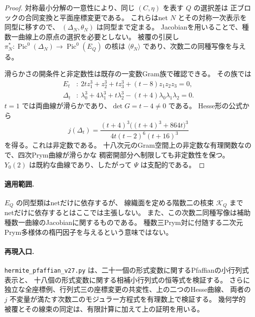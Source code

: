 \begin{proof}
対称最小分解の一意性により、同じ $(C,\eta)$ を表す $Q$ の選択差は
正ブロックの合同変換と平面座標変更である。
これらはnet $N$ とその対称一次表示を同型に移すので、
$(\Delta_N,\theta_N)$ は同型まで定まる。
Jacobianを用いることで、種数一曲線上の原点の選択を必要としない。
被覆の引戻し $\pi_N^*:\operatorname{Pic}^0(\Delta_N)\to\operatorname{Pic}^0(E_Q)$
の核は $\langle\theta_N\rangle$ であり、次数二の同種写像を与える。

滑らかさの開条件と非定数性は既存の一変数Gram族で確認できる。
その族では
\begin{align*}
 E_t&:\ 2tz_1^3+z_2^3+tz_3^3+(t-8)z_1z_2z_3=0,\\
 \Delta_t&:\ \lambda_0^3+4\lambda_1^3+t\lambda_2^3
                    -(t+4)\lambda_0\lambda_1\lambda_2=0.
\end{align*}
$t=1$ では両曲線が滑らかであり、$\det G=t-4\ne0$ である。
Hesse形の公式から
\[
 j(\Delta_t)=
 \frac{(t+4)^3\bigl((t+4)^3+864t\bigr)^3}
 {4t(t-2)^6(t+16)^3}
\]
を得る。これは非定数である。
十八次元のGram空間上の非定数な有理関数なので、四次Prym曲線が滑らかな
稠密開部分へ制限しても非定数性を保つ。
$Y_0(2)$ は既約な曲線であり、したがって $\Psi$ は支配的である。
\end{proof}

\paragraph{適用範囲.}
$E_Q$ の同型類はnetだけに依存するが、
線織面を定める階数二の核束 $\mathcal K_Q$ までnetだけに依存するとはここでは主張しない。
また、この次数二同種写像は補助種数一曲線のJacobianに関するものである。
種数三Prym対に付随する二次元Prym多様体の楕円因子を与えるという意味ではない。

\paragraph{再現入口.}
\nolinkurl{hermite_pfaffian_v27.py} は、二十一個の形式変数に関するPfaffianの小行列式表示と、
十八個の形式変数に関する相補小行列式の恒等式を検証する。
さらに独立な全座標例、行列式三の座標変更の共変性、上の二つのHesse曲線、
両者の $j$ 不変量が満たす次数二のモジュラー方程式を有理数上で検証する。
幾何学的被覆とその線束の同定は、有限計算に加えて上の証明を用いる。
